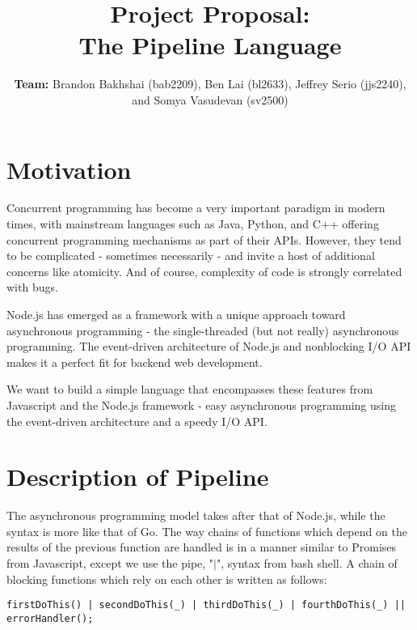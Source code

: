 \documentclass[11pt]{article}
\title{\textbf{Project Proposal:\\ The Pipeline Language}}
\author{\textbf{Team:} Brandon Bakhshai (bab2209), Ben Lai (bl2633), Jeffrey Serio (jjs2240),\\ and Somya Vasudevan (sv2500)}%
\begin{document}
\maketitle
\thispagestyle{empty}
\renewcommand{\thesubsubsection}{\thesubsection.\alph{subsubsection}.}


\section{Motivation}
\hspace{0.5cm} Concurrent programming has become a very important paradigm in 
modern times, with mainstream languages such as Java, Python, and C++ offering 
concurrent programming mechanisms as part of their APIs. However, they tend to 
be complicated - sometimes necessarily - and invite a host of additional 
concerns like atomicity. And of course, complexity of code is strongly 
correlated with bugs.

Node.js has emerged as a framework with a unique approach toward asynchronous 
programming - the single-threaded (but not really) asynchronous programming. 
The event-driven architecture of Node.js and nonblocking I/O API makes it a 
perfect fit for backend web development.

We want to build a simple language that encompasses these features from 
Javascript and the Node.js framework - easy asynchronous programming using the 
event-driven architecture and a speedy I/O API.

\section{Description of Pipeline}

\hspace{0.5cm} The asynchronous programming model takes after that of Node.js, 
while the syntax is more like that of Go. The way chains of functions which 
depend on the results of the previous function are handled is in a manner 
similar to Promises from Javascript, except we use the pipe, "$\vert$", syntax from 
bash shell. A chain of blocking functions which rely on each other is written 
as follows:

\begin{lstlisting}
firstDoThis() | secondDoThis(_) | thirdDoThis(_) | fourthDoThis(_) || errorHandler();
\end{lstlisting}
\end{document}
